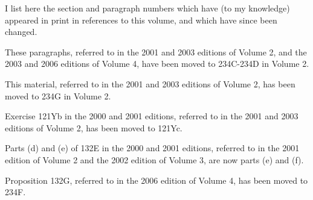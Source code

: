
\gdef\topparagraph{}
\gdef\bottomparagraph{}
\gdef\newparagraph{}

\def\chaptername{Concordance}
\def\sectionname{Concordance}

\newsection{}

\medskip

I list here the section and paragraph numbers which have (to my
knowledge) appeared in print in references to this volume, and which
have since been changed.

\medskip

 These paragraphs,
referred to in the 2001 and 2003 editions of Volume 2, and the 2003 and
2006 editions of Volume 4, have been moved to 234C-234D in Volume 2.

 This material, referred to in the 2001
and 2003 editions of Volume 2, has been moved to 234G in Volume 2.

 Exercise 1{}21Yb
in the 2000 and 2001 editions, referred to in the 2001 and 2003 editions
of Volume 2, has been moved to 121Yc.

Parts (d) and (e) of 1{}32E in the
2000 and 2001 editions, referred to in the 2001 edition of Volume 2 and
the 2002 edition of Volume 3, are now parts (e) and (f). 

 Proposition 1{}32G, referred to in the
2006 edition of Volume 4, has been moved to 234F.

